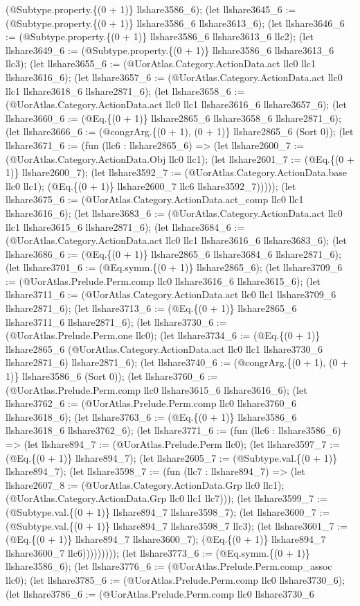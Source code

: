 \documentclass[11pt]{article}
\begin{document}
(@Subtype.property.\{(0 + 1)\} llshare3586\_6); (let llshare3645\_6 := (@Subtype.property.\{(0 + 1)\} llshare3586\_6 llshare3613\_6); (let llshare3646\_6 := (@Subtype.property.\{(0 + 1)\} llshare3586\_6 llshare3613\_6 llc2); (let llshare3649\_6 := (@Subtype.property.\{(0 + 1)\} llshare3586\_6 llshare3613\_6 llc3); (let llshare3655\_6 := (@UorAtlas.Category.ActionData.act llc0 llc1 llshare3616\_6); (let llshare3657\_6 := (@UorAtlas.Category.ActionData.act llc0 llc1 llshare3618\_6 llshare2871\_6); (let llshare3658\_6 := (@UorAtlas.Category.ActionData.act llc0 llc1 llshare3616\_6 llshare3657\_6); (let llshare3660\_6 := (@Eq.\{(0 + 1)\} llshare2865\_6 llshare3658\_6 llshare2871\_6); (let llshare3666\_6 := (@congrArg.\{(0 + 1), (0 + 1)\} llshare2865\_6 (Sort 0)); (let llshare3671\_6 := (fun (llc6 : llshare2865\_6) => (let llshare2600\_7 := (@UorAtlas.Category.ActionData.Obj llc0 llc1); (let llshare2601\_7 := (@Eq.\{(0 + 1)\} llshare2600\_7); (let llshare3592\_7 := (@UorAtlas.Category.ActionData.base llc0 llc1); (@Eq.\{(0 + 1)\} llshare2600\_7 llc6 llshare3592\_7))))); (let llshare3675\_6 := (@UorAtlas.Category.ActionData.act\_comp llc0 llc1 llshare3616\_6); (let llshare3683\_6 := (@UorAtlas.Category.ActionData.act llc0 llc1 llshare3615\_6 llshare2871\_6); (let llshare3684\_6 := (@UorAtlas.Category.ActionData.act llc0 llc1 llshare3616\_6 llshare3683\_6); (let llshare3686\_6 := (@Eq.\{(0 + 1)\} llshare2865\_6 llshare3684\_6 llshare2871\_6); (let llshare3701\_6 := (@Eq.symm.\{(0 + 1)\} llshare2865\_6); (let llshare3709\_6 := (@UorAtlas.Prelude.Perm.comp llc0 llshare3616\_6 llshare3615\_6); (let llshare3711\_6 := (@UorAtlas.Category.ActionData.act llc0 llc1 llshare3709\_6 llshare2871\_6); (let llshare3713\_6 := (@Eq.\{(0 + 1)\} llshare2865\_6 llshare3711\_6 llshare2871\_6); (let llshare3730\_6 := (@UorAtlas.Prelude.Perm.one llc0); (let llshare3734\_6 := (@Eq.\{(0 + 1)\} llshare2865\_6 (@UorAtlas.Category.ActionData.act llc0 llc1 llshare3730\_6 llshare2871\_6) llshare2871\_6); (let llshare3740\_6 := (@congrArg.\{(0 + 1), (0 + 1)\} llshare3586\_6 (Sort 0)); (let llshare3760\_6 := (@UorAtlas.Prelude.Perm.comp llc0 llshare3615\_6 llshare3616\_6); (let llshare3762\_6 := (@UorAtlas.Prelude.Perm.comp llc0 llshare3760\_6 llshare3618\_6); (let llshare3763\_6 := (@Eq.\{(0 + 1)\} llshare3586\_6 llshare3618\_6 llshare3762\_6); (let llshare3771\_6 := (fun (llc6 : llshare3586\_6) => (let llshare894\_7 := (@UorAtlas.Prelude.Perm llc0); (let llshare3597\_7 := (@Eq.\{(0 + 1)\} llshare894\_7); (let llshare2605\_7 := (@Subtype.val.\{(0 + 1)\} llshare894\_7); (let llshare3598\_7 := (fun (llc7 : llshare894\_7) => (let llshare2607\_8 := (@UorAtlas.Category.ActionData.Grp llc0 llc1); (@UorAtlas.Category.ActionData.Grp llc0 llc1 llc7))); (let llshare3599\_7 := (@Subtype.val.\{(0 + 1)\} llshare894\_7 llshare3598\_7); (let llshare3600\_7 := (@Subtype.val.\{(0 + 1)\} llshare894\_7 llshare3598\_7 llc3); (let llshare3601\_7 := (@Eq.\{(0 + 1)\} llshare894\_7 llshare3600\_7); (@Eq.\{(0 + 1)\} llshare894\_7 llshare3600\_7 llc6))))))))); (let llshare3773\_6 := (@Eq.symm.\{(0 + 1)\} llshare3586\_6); (let llshare3776\_6 := (@UorAtlas.Prelude.Perm.comp\_assoc llc0); (let llshare3785\_6 := (@UorAtlas.Prelude.Perm.comp llc0 llshare3730\_6); (let llshare3786\_6 := (@UorAtlas.Prelude.Perm.comp llc0 llshare3730\_6 
\end{document}
